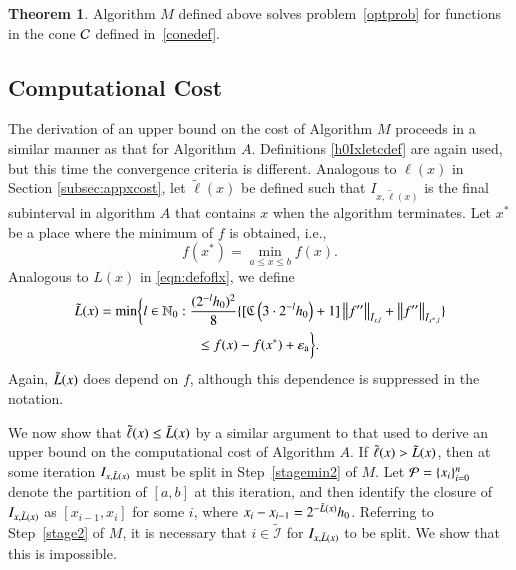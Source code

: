 \documentclass[review]{elsarticle}
\newcommand{\abstol}{\varepsilon_{\textrm{a}}}
\theoremstyle{definition}
\newcommand{\tell}{\tilde{\ell}}
\newtheorem{theorem}{Theorem}
\begin{document}
\begin{theorem} \label{thm:algMworks}
Algorithm $M$ defined above solves problem~\eqref{optprob} for functions in the cone $\mathcal{C}$ defined in~\eqref{conedef}.
\end{theorem}

\subsection{Computational Cost} \label{subsec:optcost}
The derivation of an upper bound on the cost of Algorithm $M$ proceeds in a similar manner as that for Algorithm $A$.  Definitions \eqref{h0Ixletcdef} are again used, but this time the convergence criteria is different.  Analogous to $\ell(x)$ in Section \ref{subsec:appxcost}, let $\tell(x)$ be defined such that $I_{x,\tell(x)}$ is the final subinterval in algorithm $A$ that contains $x$ when the algorithm terminates.  Let $x^*$ be a place where the minimum of $f$ is obtained, i.e.,
\[
f(x^*)  = \min_{a \le x \le b} f(x).
\]
Analogous to $L(x)$ in \eqref{eqn:defoflx}, we define
\begin{multline}\label{eqn:defofltx}
\tL(x) = \min \biggl\{ l \in \mathbb{N}_0 :  \frac{(2^{-l}h_0)^2}{8} \{[\fC\left(3\cdot2^{-l}h_0\right) + 1]\norm[\bar{I}_{x,l}]{f''} + \norm[\bar{I}_{x^*,l}]{f''}\} \\
\le f(x) - f(x^*) + \abstol  \biggr\}.
\end{multline}
Again, $\tilde{L}(x)$ does depend on $f$, although this dependence is suppressed in the notation.

We now show that $\tell(x) \le \tL(x)$ by a similar argument to that used to derive an upper bound on the computational cost of Algorithm $A$.  If $\tell(x) > \tL(x)$, then at some iteration $I_{x,\tilde{L}(x)}$ must be split in Step~\ref{stagemin2} of $M$.  Let $\mathcal{P} = \{x_i\}_{i=0}^n$ denote the partition of $[a,b]$ at this iteration, and then identify the closure of $I_{x,\tilde{L}(x)}$ as $[x_{i-1},x_i]$ for some $i$, where $x_i-x_{i-1}=2^{-\tilde{L}(x)}h_0$. Referring to Step~\ref{stage2} of $M$, it is necessary that $i \in \widetilde{\mathcal{I}}$ for $I_{x,\tilde{L}(x)}$ to be split.  We show that this is impossible.
\end{document}
